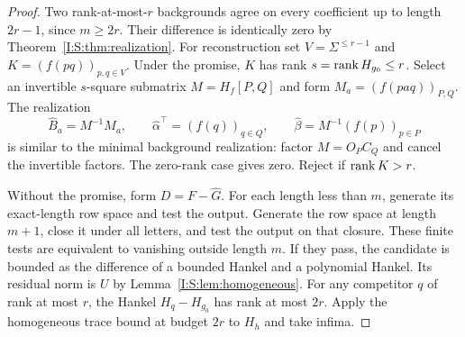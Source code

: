 \begin{proof}
Two rank-at-most-$r$ backgrounds agree on every coefficient up to length $2r-1$, since $m\ge2r$. Their difference is identically zero by Theorem~\ref{I:S:thm:realization}. For reconstruction set $V=\Sigma^{\le r-1}$ and $K=(f(pq))_{p,q\in V}$. Under the promise, $K$ has rank $s=\operatorname{rank} H_{g_0}\le r$. Select an invertible $s$-square submatrix $M=H_f[P,Q]$ and form $M_a=(f(paq))_{P,Q}$. The realization
\[
 \widehat B_a=M^{-1}M_a,\qquad
 \widehat\alpha^\top=(f(q))_{q\in Q},\qquad
 \widehat\beta=M^{-1}(f(p))_{p\in P}
\]
is similar to the minimal background realization: factor $M=O_PC_Q$ and cancel the invertible factors. The zero-rank case gives zero. Reject if $\operatorname{rank} K>r$.

Without the promise, form $D=F-\widehat G$. For each length less than $m$, generate its exact-length row space and test the output. Generate the row space at length $m+1$, close it under all letters, and test the output on that closure. These finite tests are equivalent to vanishing outside length $m$. If they pass, the candidate is bounded as the difference of a bounded Hankel and a polynomial Hankel. Its residual norm is $U$ by Lemma~\ref{I:S:lem:homogeneous}. For any competitor $q$ of rank at most $r$, the Hankel $H_q-H_{g_0}$ has rank at most $2r$. Apply the homogeneous trace bound at budget $2r$ to $H_h$ and take infima.
\end{proof}
